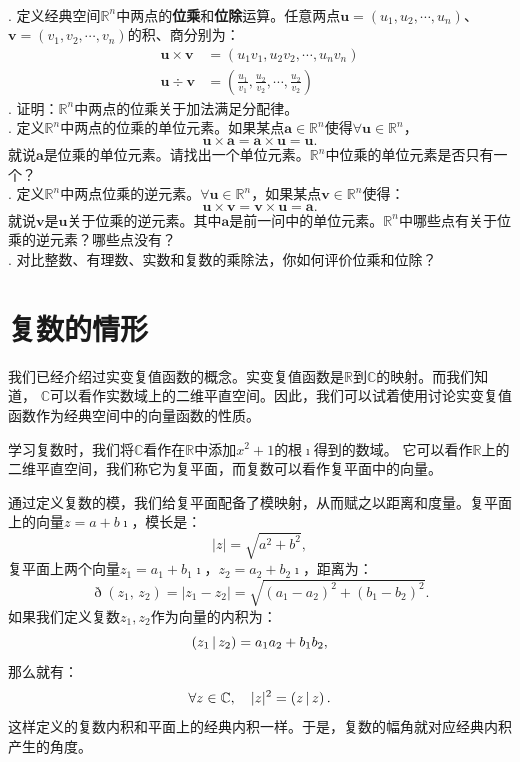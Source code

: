 \documentclass[12pt,UTF8]{ctexbook}
\begin{document}
\begin{xt}
    \mbox{} \\
    . 定义经典空间$\mathbb{R}^n$中两点的\textbf{位乘}和\textbf{位除}运算。任意两点$\mathbf{u} = (u_1, u_2, \cdots, u_n)$、$\mathbf{v} = (v_1, v_2, \cdots, v_n)$的积、商分别为：
    \begin{align*}
        \mathbf{u} \times \mathbf{v} &= (u_1 v_1, u_2 v_2, \cdots, u_n v_n) \\
        \mathbf{u} \div \mathbf{v} &= \left(\frac{u_1}{v_1}, \frac{u_2}{v_2}, \cdots, \frac{u_2}{v_2}\right)
    \end{align*}
    . 证明：$\mathbb{R}^n$中两点的位乘关于加法满足分配律。\\
    . 定义$\mathbb{R}^n$中两点的位乘的单位元素。如果某点$\mathbf{a}\in\mathbb{R}^n$使得$\forall \mathbf{u}\in\mathbb{R}^n$，
    $$\mathbf{u}\times \mathbf{a} = \mathbf{a}\times \mathbf{u} = \mathbf{u}.  $$
    就说$\mathbf{a}$是位乘的单位元素。请找出一个单位元素。$\mathbb{R}^n$中位乘的单位元素是否只有一个？\\
    . 定义$\mathbb{R}^n$中两点位乘的逆元素。$\forall \mathbf{u}\in\mathbb{R}^n$，如果某点$\mathbf{v}\in\mathbb{R}^n$使得：
    $$\mathbf{u}\times \mathbf{v} = \mathbf{v}\times \mathbf{u} = \mathbf{a}.  $$
    就说$\mathbf{v}$是$\mathbf{u}$关于位乘的逆元素。其中$\mathbf{a}$是前一问中的单位元素。$\mathbb{R}^n$中哪些点有关于位乘的逆元素？哪些点没有？\\
    . 对比整数、有理数、实数和复数的乘除法，你如何评价位乘和位除？
\end{xt}

\section{复数的情形}

我们已经介绍过实变复值函数的概念。实变复值函数是$\mathbb{R}$到$\mathbb{C}$的映射。而我们知道，
$\mathbb{C}$可以看作实数域上的二维平直空间。因此，我们可以试着使用讨论实变复值函数作为经典空间中的向量函数的性质。

学习复数时，我们将$\mathbb{C}$看作在$\mathbb{R}$中添加$x^2 + 1$的根$\imath$得到的数域。
它可以看作$\mathbb{R}$上的二维平直空间，我们称它为复平面，而复数可以看作复平面中的向量。

通过定义复数的模，我们给复平面配备了模映射，从而赋之以距离和度量。复平面上的向量$z = a + b\imath$，模长是：
$$ |z| = \sqrt{a^2 + b^2},$$
复平面上两个向量$z_1 = a_1 + b_1\imath$，$z_2 = a_2 + b_2\imath$，距离为：
$$ \eth(z_1,\, z_2) = |z_1 - z_2| = \sqrt{(a_1 - a_2)^2 + (b_1 - b_2)^2}. $$
如果我们定义复数$z_1, z_2$作为向量的内积为：
$$ \displaystyle\left( z_1 \,|\, z_2 \right) = a_1a_2 + b_1b_2,$$
那么就有：
$$ \forall z \in \mathbb{C}, \quad |z|^2 = \displaystyle\left( z \,|\, z \right). $$
这样定义的复数内积和平面上的经典内积一样。于是，复数的幅角就对应经典内积产生的角度。
\end{document}
